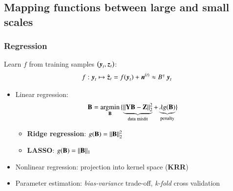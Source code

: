 \documentclass{beamer}
\let\olditem\item
\renewcommand{\item}{\setlength{\itemsep}{\fill}\olditem}
\begin{document}
\subsection{Mapping functions between large and small scales}

\begin{frame}
\frametitle{Regression}	
	\begin{tcolorbox}[colback=red!5!white,colframe=red!75!black]	
		Learn $ f $ from training samples $ \left(\operatorname{\boldsymbol{y}}_t, \operatorname{\boldsymbol{z}}_t\right) $: 
		\begin{equation*}
			f:  \operatorname{\boldsymbol{y}}_t \mapsto  \hat{\operatorname{\boldsymbol{z}}}_t = f(\operatorname{\boldsymbol{y}}_t) + \operatorname{\boldsymbol{n}}^{(t)} \approx B^{\intercal}\operatorname{\boldsymbol{y}}_t 
		\end{equation*}
 	\end{tcolorbox}	
 	\begin{itemize} \itemsep0em
 	\item Linear regression:
 	\begin{equation*}
	 	\mathbf{B}= \operatorname*{\arg\!\min}_{\mathbf{B}}{ \{ \underbrace{\Vert \mathbf{Y}\mathbf{B}-\mathbf{Z}\Vert^2_2}_{\text{data misfit}} + \underbrace{\lambda g(\mathbf{B})}_{\text{penalty}} \} }
 	\end{equation*}
	\begin{itemize}
		\item \textbf{\color{red}Ridge regression}: $ g(\mathbf{B}) = \Vert \mathbf{B}\Vert^2_2 $
		\item \textbf{\color{red}LASSO}: $ g(\mathbf{B}) = \Vert \mathbf{B}\Vert_1 $
	\end{itemize} 	
	
	\item Nonlinear regression: projection into kernel space (\textbf{\color{red}KRR})
	\item Parameter estimation: \emph{bias-variance} trade-off, \textit{k-fold} cross validation
	\end{itemize} 	
\end{frame}
\end{document}
